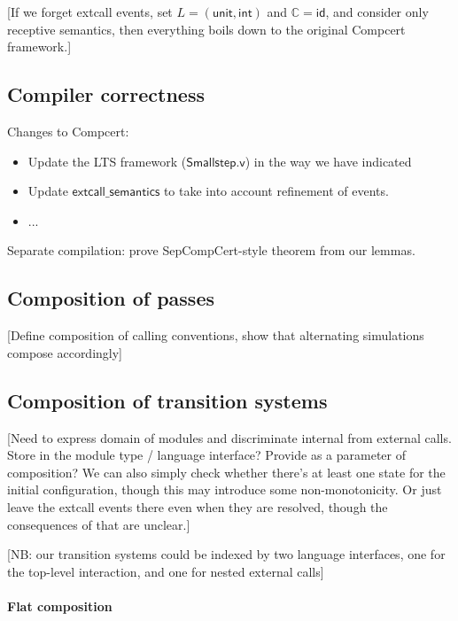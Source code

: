 \documentclass[sigplan,10pt,review,anonymous]{acmart}
\newcommand{\kw}[1]{\ensuremath{ \textsf{#1} }}
\begin{document}
[If we forget extcall events,
set $L = (\kw{unit}, \kw{int})$ and $\mathbb{C} = \kw{id}$,
and consider only receptive semantics,
then everything boils down to the original Compcert framework.]


\subsection{Compiler correctness} %

Changes to Compcert:
\begin{itemize}
\item Update the LTS framework (\kw{Smallstep.v})
  in the way we have indicated
\item Update \kw{extcall\_semantics} to take into account
  refinement of events.
\item ...
\end{itemize}  

Separate compilation:
prove SepCompCert-style theorem from our lemmas.


\subsection{Composition of passes} %

[Define composition of calling conventions,
show that alternating simulations compose accordingly]


\subsection{Composition of transition systems} %

[Need to express domain of modules and discriminate
internal from external calls.
Store in the module type / language interface?
Provide as a parameter of composition?
We can also simply check whether there's at least
one state for the initial configuration,
though this may introduce some non-monotonicity.
Or just leave the extcall events there even when
they are resolved,
though the consequences of that are unclear.]

[NB: our transition systems could be indexed by two language interfaces,
one for the top-level interaction, and one for nested external calls]

\paragraph{Flat composition} %
\end{document}

